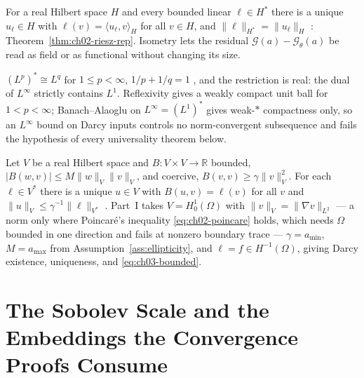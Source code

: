 \begin{theorem}\label{thm:appa-riesz}
For a real Hilbert space $H$ and every bounded linear $\ell \in H^*$ there is a unique
$u_\ell \in H$ with $\ell(v) = \langle u_\ell, v \rangle_H$ for all $v \in H$, and
$\|\ell\|_{H^*} = \|u_\ell\|_H$ \cite{brezis2011functional}: Theorem~\ref{thm:ch02-riesz-rep}.
Isometry lets the residual $\mathcal{G}(a) - \mathcal{G}_\theta(a)$ be read as field or as
functional without changing its size.
\end{theorem}

\begin{remark}\label{rem:appa-banach}
$(L^p)^* \cong L^q$ for $1 \le p < \infty$, $1/p + 1/q = 1$ \cite{brezis2011functional}, and the
restriction is real: the
dual of $L^\infty$ strictly contains $L^1$. Reflexivity gives a weakly compact unit ball for
$1 < p < \infty$; Banach--Alaoglu on $L^\infty = (L^1)^*$ gives weak-$*$ compactness only, so
an $L^\infty$ bound on Darcy inputs controls no norm-convergent subsequence and fails the
hypothesis of every universality theorem below.
\end{remark}

\begin{theorem}\label{thm:appa-lax-milgram}
Let $V$ be a real Hilbert space and $B : V \times V \to \mathbb{R}$ bounded,
$|B(w,v)| \le M\|w\|_V\|v\|_V$, and coercive, $B(v,v) \ge \gamma\|v\|_V^2$. For each
$\ell \in V^*$ there is a unique $u \in V$ with $B(u,v) = \ell(v)$ for all $v$ and
$\|u\|_V \le \gamma^{-1}\|\ell\|_{V^*}$ \cite{brezis2011functional, evans2010partial}.
Part~I takes $V = H^1_0(\Omega)$ with
$\|v\|_V = \|\nabla v\|_{L^2}$ --- a norm only where Poincar\'e's inequality
\eqref{eq:ch02-poincare} holds, which needs $\Omega$ bounded in one direction and fails at
nonzero boundary trace --- $\gamma = a_{\min}$, $M = a_{\max}$ from
Assumption~\ref{ass:ellipticity}, and $\ell = f \in H^{-1}(\Omega)$, giving Darcy existence,
uniqueness, and \eqref{eq:ch03-bounded}.
\end{theorem}

\section{The Sobolev Scale and the Embeddings the Convergence Proofs Consume}

